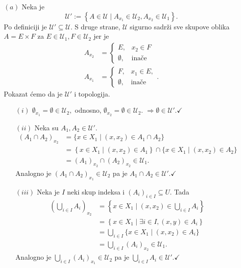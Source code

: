 \documentclass{article}
\begin{document}
\begin{enumerate}
    \item[\((a)\)] Neka je \[\mathcal U':=\left\{A\in\mathcal U\mid A_{x_1}\in\mathcal U_2,A_{x_2}\in\mathcal U_1\right\}.\] Po definiciji je \(\mathcal U'\subseteq\mathcal U.\) S druge strane, \(\mathcal U\) sigurno sadrži sve skupove oblika \(A=E\times F\) za \(E\in\mathcal U_1,F\in\mathcal U_2\) jer je \[\begin{aligned}A_{x_2}&=\begin{cases}E,& x_2\in F\\\emptyset,&\text{inače}\end{cases}\\A_{x_1}&=\begin{cases}F,&x_1\in E,\\\emptyset,&\text{inače}\end{cases}.\end{aligned}\] Pokazat ćemo da je \(\mathcal U'\) i topologija. \begin{itemize}
        \item[\((i)\)] \(\emptyset_{x_1}=\emptyset\in\mathcal U_2,\) odnosno, \(\emptyset_{x_2}=\emptyset\in\mathcal U_2.\) \(\Rightarrow\emptyset\in\mathcal U'.\checkmark\) 
        \item[\((ii)\)] Neka su \(A_1,A_2\in\mathcal U'.\) \[\begin{aligned}(A_1\cap A_2)_{x_2}&=\{x\in X_1\mid (x,x_2)\in A_1\cap A_2\}\\&=\left\{x\in X_1\mid (x,x_2)\in A_1\right\}\cap\{x\in X_1\mid (x,x_2)\in A_2\}\\&=(A_1)_{x_2}\cap (A_2)_{x_2}\in\mathcal U_1.\end{aligned}\] Analogno je \((A_1\cap A_2)_{x_1}\in\mathcal U_2\) pa je \(A_1\cap A_2\in\mathcal U'.\checkmark\)
        \item[\((iii)\)] Neka je \(I\) neki skup indeksa i \((A_i)_{i\in I}\subseteq U.\) Tada \[\begin{aligned}\left(\bigcup_{i\in I}A_i\right)_{x_2}&=\left\{x\in X_1\mid (x,x_2)\in\bigcup_{i\in I}A_i\right\}\\&=\left\{x\in X_1\mid \exists i\in I,(x,y)\in A_i\right\}\\&=\bigcup_{i\in I}\{x\in X_1\mid (x,x_2)\in A_i\}\\&=\bigcup_{i\in I}(A_i)_{x_2}\in\mathcal U_1.\end{aligned}\] Analogno je \(\displaystyle\bigcup_{i\in I}(A_i)_{x_1}\in\mathcal U_2\) pa je \(\displaystyle\bigcup_{i\in I}A_i\in\mathcal U'.\checkmark\)

\end{itemize}
\end{enumerate}
\end{document}

